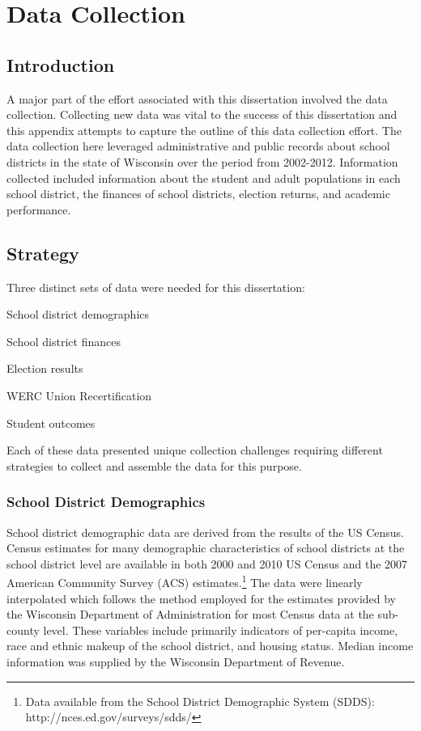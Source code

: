 \chapter{Data Collection}
\label{app:data}

\section*{Introduction}

A major part of the effort associated with this dissertation involved the data 
collection. Collecting new data was vital to the success of this dissertation and
this appendix attempts to capture the outline of this data collection effort. The 
data collection here leveraged administrative and public records about school 
districts in the state of Wisconsin over the period from 2002-2012. Information 
collected included information about the student and adult populations in each 
school district, the finances of school districts, election returns, and academic 
performance. 

\section*{Strategy}

Three distinct sets of data were needed for this dissertation:
\begin{myitemize}
  \item School district demographics
  \item School district finances
  \item Election results
  \item WERC Union Recertification
  \item Student outcomes
\end{myitemize}

Each of these data presented unique collection challenges requiring different 
strategies to collect and assemble the data for this purpose. 

\subsection*{School District Demographics}

School district demographic data are derived from the results of the US Census. 
Census estimates for many demographic characteristics of school districts at the 
school district level are available in both 2000 and 2010 US Census and the 
2007 American Community Survey (ACS) estimates.\footnote{Data available from the 
School District Demographic System (SDDS): http://nces.ed.gov/surveys/sdds/} The 
data were linearly interpolated which follows the method employed for the estimates 
provided by the Wisconsin Department of Administration for most Census data at the 
sub-county level. These variables include primarily indicators of per-capita 
income, race and ethnic makeup of the school district, and housing status. Median 
income information was supplied by the Wisconsin Department of Revenue.

